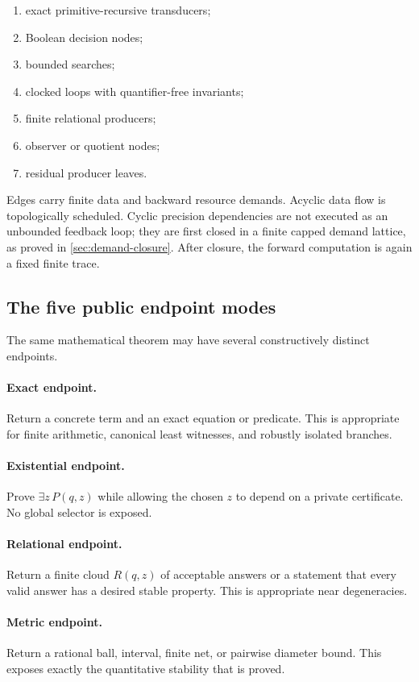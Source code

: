 \begin{enumerate}
\item exact primitive-recursive transducers;
\item Boolean decision nodes;
\item bounded searches;
\item clocked loops with quantifier-free invariants;
\item finite relational producers;
\item observer or quotient nodes;
\item residual producer leaves.
\end{enumerate}

Edges carry finite data and backward resource demands.  Acyclic data flow is topologically scheduled.  Cyclic precision dependencies are not executed as an unbounded feedback loop; they are first closed in a finite capped demand lattice, as proved in \cref{sec:demand-closure}.  After closure, the forward computation is again a fixed finite trace.

\subsection{The five public endpoint modes}

The same mathematical theorem may have several constructively distinct endpoints.

\paragraph{Exact endpoint.}
Return a concrete term and an exact equation or predicate.  This is appropriate for finite arithmetic, canonical least witnesses, and robustly isolated branches.

\paragraph{Existential endpoint.}
Prove \(\exists z\,P(q,z)\) while allowing the chosen \(z\) to depend on a private certificate.  No global selector is exposed.

\paragraph{Relational endpoint.}
Return a finite cloud \(R(q,z)\) of acceptable answers or a statement that every valid answer has a desired stable property.  This is appropriate near degeneracies.

\paragraph{Metric endpoint.}
Return a rational ball, interval, finite net, or pairwise diameter bound.  This exposes exactly the quantitative stability that is proved.

